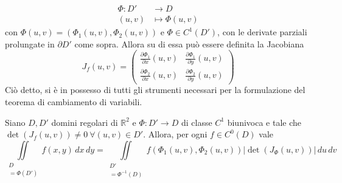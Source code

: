 \begin{equation*}
\begin{aligned}
    \Phi: D' &\to D\\
    (u,v) &\mapsto \Phi(u,v)
\end{aligned}
\end{equation*}
con $\Phi(u,v)=(\Phi_1(u,v), \Phi_2(u,v))$ e $\Phi \in C^1(D')$, con le derivate parziali prolungate in $\partial D'$ come sopra. Allora su di essa può essere definita la Jacobiana 
\begin{equation*}
    J_f(u,v)=\begin{pmatrix}
        \frac{\partial \Phi_1}{\partial x}(u,v) & \frac{\partial \Phi_1}{\partial y} (u,v)\\
        \frac{\partial \Phi_2}{\partial x} (u,v) & \frac{\partial \Phi_2}{\partial y} (u,v)
    \end{pmatrix}
\end{equation*}
Ciò detto, si è in possesso di tutti gli strumenti necessari per la formulazione del teorema di cambiamento di variabili.
\begin{theorem} \label{Teo: Formula cambiamento variabili}
    Siano $D, D'$ domini regolari di $\mathbb{R}^2$ e $\Phi: D' \to D$ di classe $C^1$ biunivoca e tale che $\det(J_f(u,v)) \neq 0\ \forall(u,v) \in D'$. Allora, per ogni $f \in C^0(D)$ vale
    \begin{equation} \label{Eq: Formula cambiamento di variabili}
        \iint\limits_{\substack{D\\=\Phi(D')}}
        f(x,y)\,dx\,dy= \iint\limits_{\substack{D'\\=\Phi^{-1}(D)}}{f(\Phi_1(u,v), \Phi_2(u,v))\left|\det(J_\Phi(u,v))\right|}\,du\,dv
    \end{equation}
\end{theorem}
